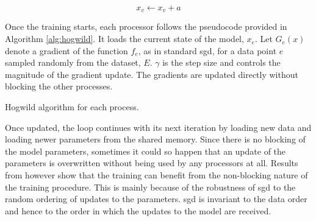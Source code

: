 $$
x_{v} \leftarrow x_{v}+a
$$

Once the training starts, each processor follows the pseudocode provided in Algorithm \ref{alg:hogwild}. It loads the current state of the model, $x_e$. Let $G_{e}(x)$ denote a gradient of the function $f_{e}$, as in standard \acrshort{sgd}, for a data point $e$ sampled randomly from the dataset, $E$. $\gamma$ is the step size and controls the magnitude of the gradient update. The gradients are updated directly without blocking the other processes.


\begin{algorithm}
\caption{Hogwild algorithm for each process.}\label{alg:hogwild}
\end{algorithm}

Once updated, the loop continues with its next iteration by loading new data and loading newer parameters from the shared memory. Since there is no blocking of the model parameters, sometimes  it could so happen that an update of the parameters is overwritten without being used by any processors at all. Results from \cite{Niu2011HOGWILD:Descent} however show that the training can benefit from the non-blocking nature of the training procedure. This is mainly because of the robustness of \acrshort{sgd} to the random ordering of updates to the parameters. \acrshort{sgd} is invariant to the data order and hence to the order in which the updates to the model are received.

